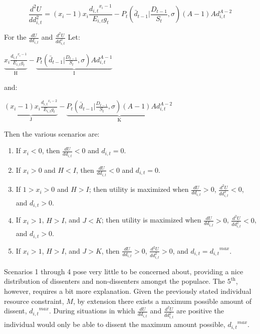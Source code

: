 \documentclass[12pt]{article}
\begin{document}
\begin{spacing}{1.5}
\begin{equation}
\frac{d^2U}{dd_{i,t}^2}=(x_i -1) x_i \frac{{d_{i,t}}^{x_i -1}}{E_{i,t} g_t} - P_t \left(\bar{d}_{t-1} \Big|\frac{D_{t-1}}{S_t},\sigma \right)(A-1)Ad_{i,t}^{A-2}  
\end{equation}

\noindent For the $\frac{dU}{dd_{i,t}}$ and $\frac{d^2U}{dd_{i,t}^2}$ Let:    
\begin{center}
$\underbrace{ x_i \frac{{d_{i,t}}^{x_i -1}}{E_{i,t} g_t}}_\textrm{H} - \underbrace{P_t \left(\bar{d}_{t-1} \Big|\frac{D_{t-1}}{S_t},\sigma \right)Ad_{i,t}^{A-1}}_\textrm{I}$  	
\end{center}

\noindent and: 

\begin{center}
$\underbrace{(x_i -1) x_i \frac{{d_{i,t}}^{x_i -2}}{E_{i,t} g_t}}_\textrm{J} -\underbrace{P_t \left(\bar{d}_{t-1}\Big|\frac{D_{t-1}}{S_t},\sigma \right)(A-1)Ad_{i,t}^{A-2}}_\textrm{K}$  
\end{center}

\noindent Then the various scenarios are: 
\begin{enumerate}
\item If $x_i<0$, then $\frac{dU}{dd_{i,t}} < 0$ and $d_{i,t}=0$. 
\item If $x_i>0$ and $H<I$, then $\frac{dU}{dd_{i,t}} < 0$ and $d_{i,t}=0$. 
\item If $1>x_i>0$ and $H>I$; then utility is maximized when $\frac{dU}{dd_{i,t}} > 0$, $\frac{d^2U}{dd_{i,t}^2}<0$, and $d_{i,t}>0$.  
\item If $x_i>1$, $H>I$, and $J<K$; then utility is maximized when $\frac{dU}{dd_{i,t}} > 0$, $\frac{d^2U}{dd_{i,t}^2}<0$, and $d_{i,t}>0$. 
\item If $x_i>1$, $H>I$, and $J>K$, then $\frac{dU}{dd_{i,t}} > 0$, $\frac{d^2U}{dd_{i,t}^2}>0$, and $d_{i,t}={d_{i,t}}^{max} $. 
\end{enumerate}

Scenarios 1 through 4 pose very little to be concerned about, providing a nice distribution of dissenters and non-dissenters amongst the populace. The $\text{5}^{\text{th}}$, however, requires a bit more explanation. Given the previously stated individual resource constraint, $M$, by extension there exists a maximum possible amount of dissent, ${d_{i,t}}^{max}$. During situations in which $\frac{dU}{dd_{i,t}}$ and $\frac{d^2U}{dd_{i,t}^2}$ are positive the individual would only be able to dissent the maximum amount possible, ${d_{i,t}}^{max}$.  


\end{spacing}
\end{document}
